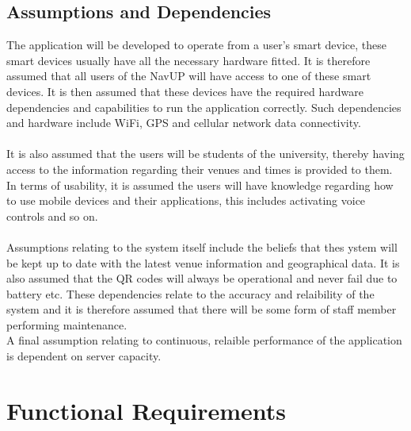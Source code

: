 \documentclass{article}
\begin{document}
	
	\subsection{Assumptions and Dependencies}
		The application will be developed to operate from a user's smart device, these smart devices usually have all the necessary hardware fitted. It is therefore assumed that all users of the NavUP will have access to one of these smart devices. It is then assumed that these devices have the required hardware dependencies and capabilities to run the application correctly. Such dependencies and hardware include WiFi, GPS and cellular network data connectivity.\\ \\
		It is also assumed that the users will be students of the university, thereby having access to the information regarding their venues and times is provided to them.\\
		In terms of usability, it is assumed the users will have knowledge regarding how to use mobile devices and their applications, this includes activating voice controls and so on. \\ \\
		Assumptions relating to the system itself include the beliefs that thes ystem will be kept up to date with the latest venue information and geographical data. It is also assumed that the QR codes will always be operational and never fail due to battery etc. These dependencies relate to the accuracy and relaibility of the system and it is therefore assumed that there will be some form of staff member performing maintenance.\\
		A final assumption relating to continuous, relaible performance of the application is dependent on server capacity.
		
		
		

\newpage
\section{Functional Requirements}
\end{document}

